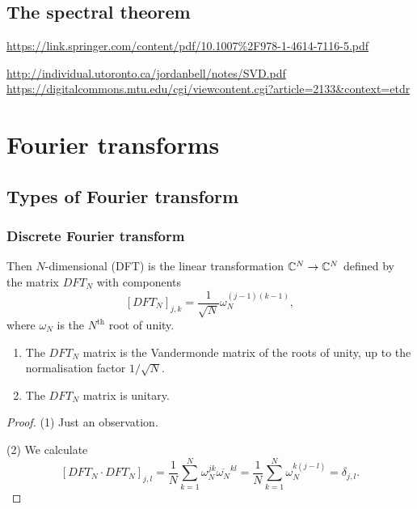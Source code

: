 \section{The spectral theorem}
\url{https://link.springer.com/content/pdf/10.1007%2F978-1-4614-7116-5.pdf}

\url{http://individual.utoronto.ca/jordanbell/notes/SVD.pdf}
\url{https://digitalcommons.mtu.edu/cgi/viewcontent.cgi?article=2133&context=etdr}



\chapter{Fourier transforms}

\section{Types of Fourier transform}

\subsection{Discrete Fourier transform}
\begin{definition}
Then $N$-dimensional  (DFT) is the linear transformation $\mathbb{C}^N \to \mathbb{C}^N$ defined by the matrix $DFT_N$ with components
\[ [DFT_N]_{j,k} = \frac{1}{\sqrt{N}}\omega_N^{(j-1)(k-1)}, \]
where $\omega_N$ is the $N^\text{th}$ root of unity.
\end{definition}

\begin{lemma} \mbox{}
\begin{enumerate}
\item The $DFT_N$ matrix is the Vandermonde matrix of the roots of unity, up to the normalisation factor $1/\sqrt{N}$.
\item The $DFT_N$ matrix is unitary.
\end{enumerate}
\end{lemma}
\begin{proof}
(1) Just an observation.

(2) We calculate
\[ [DFT_N\cdot DFT_N]_{j,l} = \frac{1}{N}\sum_{k=1}^N\omega_N^{jk}\overline{\omega_N}^{kl} = \frac{1}{N}\sum_{k=1}^N\omega_N^{k(j-l)} = \delta_{j,l}. \]
\end{proof}
